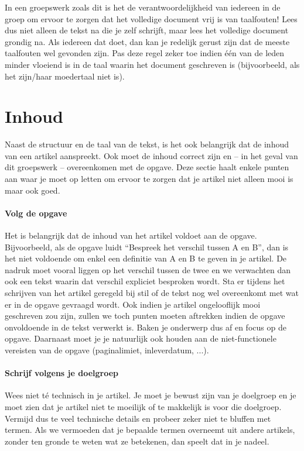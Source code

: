 \documentclass[a4paper]{article}
\begin{document}
In een groepswerk zoals dit is het de verantwoordelijkheid van iedereen in de groep om ervoor te zorgen dat het volledige document vrij is van taalfouten!
Lees dus niet alleen de tekst na die je zelf schrijft, maar lees het volledige document grondig na.
Als iedereen dat doet, dan kan je redelijk gerust zijn dat de meeste taalfouten wel gevonden zijn.
Pas deze regel zeker toe indien \'e\'en van de leden minder vloeiend is in de taal waarin het document geschreven is (bijvoorbeeld, als het zijn/haar moedertaal niet is).


\section{Inhoud}

Naast de structuur en de taal van de tekst, is het ook belangrijk dat de inhoud van een artikel aanspreekt.
Ook moet de inhoud correct zijn en – in het geval van dit groepswerk – overeenkomen met de opgave.
Deze sectie haalt enkele punten aan waar je moet op letten om ervoor te zorgen dat je artikel niet alleen mooi is maar ook goed.


\paragraph{Volg de opgave}

Het is belangrijk dat de inhoud van het artikel voldoet aan de opgave.
Bijvoorbeeld, als de opgave luidt ``Bespreek het verschil tussen A en B'', dan is het niet voldoende om enkel een definitie van A en B te geven in je artikel.
De nadruk moet vooral liggen op het verschil tussen de twee en we verwachten dan ook een tekst waarin dat verschil expliciet besproken wordt.
Sta er tijdens het schrijven van het artikel geregeld bij stil of de tekst nog wel overeenkomt met wat er in de opgave gevraagd wordt.
Ook indien je artikel ongelooflijk mooi geschreven zou zijn, zullen we toch punten moeten aftrekken indien de opgave onvoldoende in de tekst verwerkt is.
Baken je onderwerp dus af en focus op de opgave.
Daarnaast moet je je natuurlijk ook houden aan de niet-functionele vereisten van de opgave (paginalimiet, inleverdatum, ...).


\paragraph{Schrijf volgens je doelgroep}

Wees niet t\'e technisch in je artikel.
Je moet je bewust zijn van je doelgroep en je moet zien dat je artikel niet te moeilijk of te makkelijk is voor die doelgroep.
Vermijd dus te veel technische details en probeer zeker niet te bluffen met termen.
Als we vermoeden dat je bepaalde termen overneemt uit andere artikels, zonder ten gronde te weten wat ze betekenen, dan speelt dat in je nadeel.
\end{document}
